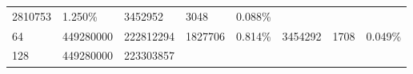 \documentclass[11pt]{article}
\begin{document}
\begin{longtable}[]{@{}llllllll@{}}
\begin{minipage}[t]{0.09\columnwidth}
2810753\strut
\end{minipage} & \begin{minipage}[t]{0.09\columnwidth}\raggedright\strut
1.250\%\strut
\end{minipage} & \begin{minipage}[t]{0.09\columnwidth}\raggedright\strut
3452952\strut
\end{minipage} & \begin{minipage}[t]{0.10\columnwidth}\raggedright\strut
3048\strut
\end{minipage} & \begin{minipage}[t]{0.10\columnwidth}\raggedright\strut
0.088\%\strut
\end{minipage}\tabularnewline
\begin{minipage}[t]{0.14\columnwidth}\raggedright\strut
64\strut
\end{minipage} & \begin{minipage}[t]{0.10\columnwidth}\raggedright\strut
449280000\strut
\end{minipage} & \begin{minipage}[t]{0.08\columnwidth}\raggedright\strut
222812294\strut
\end{minipage} & \begin{minipage}[t]{0.09\columnwidth}\raggedright\strut
1827706\strut
\end{minipage} & \begin{minipage}[t]{0.09\columnwidth}\raggedright\strut
0.814\%\strut
\end{minipage} & \begin{minipage}[t]{0.09\columnwidth}\raggedright\strut
3454292\strut
\end{minipage} & \begin{minipage}[t]{0.10\columnwidth}\raggedright\strut
1708\strut
\end{minipage} & \begin{minipage}[t]{0.10\columnwidth}\raggedright\strut
0.049\%\strut
\end{minipage}\tabularnewline
\begin{minipage}[t]{0.14\columnwidth}\raggedright\strut
128\strut
\end{minipage} & \begin{minipage}[t]{0.10\columnwidth}\raggedright\strut
449280000\strut
\end{minipage} & \begin{minipage}[t]{0.08\columnwidth}\raggedright\strut
223303857\strut
\end{minipage} & \begin{minipage}[t]{0.09\columnwidth}\raggedright\strut

\end{minipage}
\end{longtable}
\end{document}
